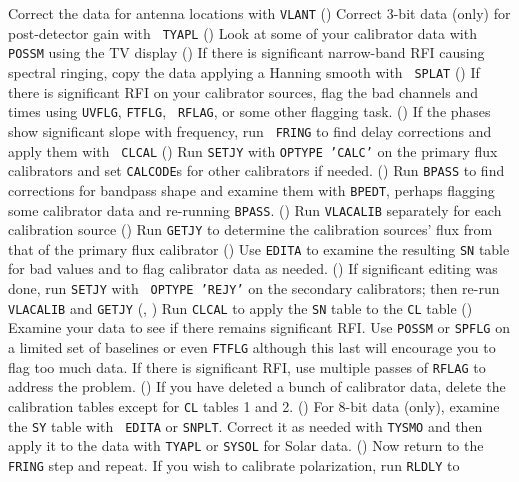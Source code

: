 \xben
\Item Correct the data for antenna locations with {\tt VLANT}
      ()
\Item Correct 3-bit data (only) for post-detector gain with {\tt
      TYAPL} ()
\Item Look at some of your calibrator data with {\tt POSSM} using the
      TV display ()
\Item If there is significant narrow-band RFI causing spectral
      ringing, copy the data applying a Hanning smooth with {\tt
      SPLAT} ()
\Item If there is significant RFI on your calibrator sources, flag the
      bad channels and times using {\tt UVFLG}, {\tt FTFLG}, {\tt
      RFLAG}, or some other flagging task. ()
\Item If the phases show significant slope with frequency, run {\tt
      FRING} to find delay corrections and apply them with {\tt
      CLCAL} ()
\Item Run {\tt SETJY} with {\tt OPTYPE 'CALC'} on the primary flux
      calibrators and set {\tt CALCODE}s for other calibrators if
      needed. ()
\Item Run {\tt BPASS} to find corrections for bandpass shape and
      examine them with {\tt BPEDT}, perhaps flagging some calibrator
      data and re-running {\tt BPASS}. ()
\Item Run {\tt VLACALIB} separately for each calibration source
      ()
\Item Run {\tt GETJY} to determine the calibration sources' flux from
      that of the primary flux calibrator ()
\Item Use {\tt EDITA} to examine the resulting {\tt SN} table for bad
      values and to flag calibrator data as needed. ()
\Item If significant editing was done, run {\tt SETJY} with {\tt
      OPTYPE 'REJY'} on the secondary calibrators; then re-run {\tt
      VLACALIB} and {\tt GETJY} (, )
\Item Run {\tt CLCAL} to apply the {\tt SN} table to the {\tt CL}
      table ()
\Item Examine your data to see if there remains significant RFI.  Use
      {\tt POSSM} or {\tt SPFLG} on a limited set of baselines or even
      {\tt FTFLG} although this last will encourage you to flag too
      much data.
\Item If there is significant RFI, use multiple passes of {\tt RFLAG}
      to address the problem. ()
\Item If you have deleted a bunch of calibrator data, delete the
      calibration tables except for {\tt CL} tables 1 and 2.
      ()
\Item For 8-bit data (only), examine the {\tt SY} table with {\tt
      EDITA} or {\tt SNPLT}\@.  Correct it as needed with {\tt TYSMO}
      and then apply it to the data with {\tt TYAPL} or {\tt SYSOL}
      for Solar data. ()
\Item Now return to the {\tt FRING} step and repeat.
\Item If you wish to calibrate polarization, run {\tt RLDLY} to
